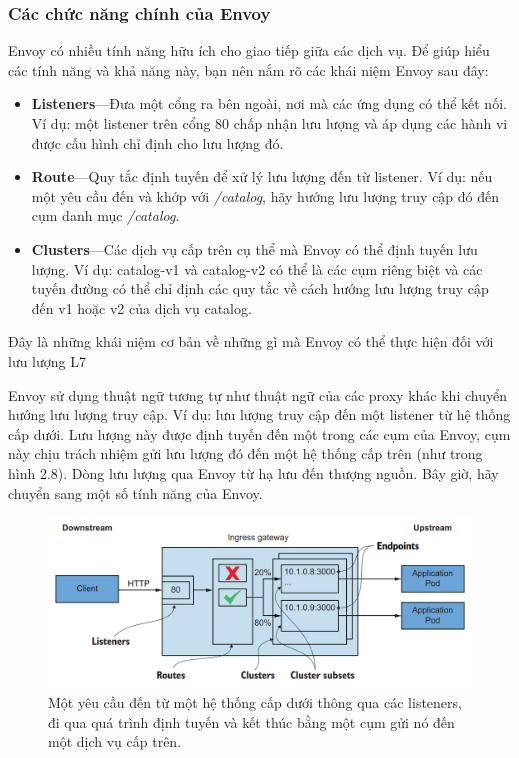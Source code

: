 \documentclass[12pt,a4paper]{report}
\begin{document}
			\subsubsection{Các chức năng chính của Envoy}
		\hspace{0.6cm}Envoy có nhiều tính năng hữu ích cho giao tiếp giữa các dịch vụ. Để giúp hiểu các tính năng và khả năng này, bạn nên nắm rõ các khái niệm Envoy sau đây:
		\begin{itemize}
			\item \textbf{Listeners}—Đưa một cổng ra bên ngoài, nơi mà các ứng dụng có thể kết nối. Ví dụ: một listener trên cổng 80 chấp nhận lưu lượng và áp dụng các hành vi được cấu hình chỉ định cho lưu lượng đó.
			\item \textbf{Route}—Quy tắc định tuyến để xử lý lưu lượng đến từ listener. Ví dụ: nếu một yêu cầu đến và khớp với \textit{/catalog}, hãy hướng lưu lượng truy cập đó đến cụm danh mục \textit{/catalog}.
			\item \textbf{Clusters}—Các dịch vụ cấp trên cụ thể mà Envoy có thể định tuyến lưu lượng. Ví dụ: catalog-v1 và catalog-v2 có thể là các cụm riêng biệt và các tuyến đường có thể chỉ định các quy tắc về cách hướng lưu lượng truy cập đến v1 hoặc v2 của dịch vụ catalog.
		\end{itemize}
		
		Đây là những khái niệm cơ bản về những gì mà Envoy có thể thực hiện đối với lưu lượng L7
		
		Envoy sử dụng thuật ngữ tương tự như thuật ngữ của các proxy khác khi chuyển hướng lưu lượng truy cập. Ví dụ: lưu lượng truy cập đến một listener từ hệ thống cấp dưới. Lưu lượng này được định tuyến đến một trong các cụm của Envoy, cụm này chịu trách nhiệm gửi lưu lượng đó đến một hệ thống cấp trên (như trong hình 2.8). Dòng lưu lượng qua Envoy từ hạ lưu đến thượng nguồn. Bây giờ, hãy chuyển sang một số tính năng của Envoy.
		\begin{figure}[h]
			\centering
			\includegraphics[width=0.9\linewidth]{Pics/2.1.3-p3}
			\caption{Một yêu cầu đến từ một hệ thống cấp dưới thông qua các listeners, đi qua quá trình định tuyến và kết thúc bằng một cụm gửi nó đến một dịch vụ cấp trên.}
			\label{fig:2.1.3-3}
		\end{figure}
	
\end{document}
